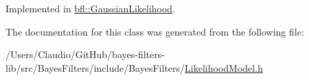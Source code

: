 Implemented in \mbox{\hyperlink{classbfl_1_1GaussianLikelihood_a07bbe94864e1cf4ccb2232e51673575a}{bfl\+::\+Gaussian\+Likelihood}}.



The documentation for this class was generated from the following file\+:\begin{DoxyCompactItemize}
\item 
/\+Users/\+Claudio/\+Git\+Hub/bayes-\/filters-\/lib/src/\+Bayes\+Filters/include/\+Bayes\+Filters/\mbox{\hyperlink{LikelihoodModel_8h}{Likelihood\+Model.\+h}}\end{DoxyCompactItemize}
